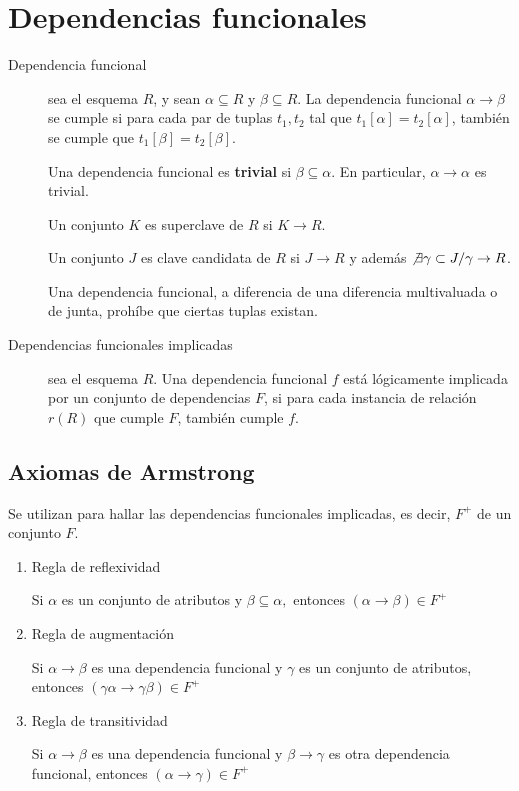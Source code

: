 \documentclass[a4paper, twoside]{article}
\begin{document}
\section{Dependencias funcionales}
\begin{description}
	\item[Dependencia funcional] sea el esquema $R$, y sean $\alpha \subseteq R$ y $\beta\subseteq R$. La dependencia funcional $\alpha \to \beta$ se cumple si para cada par de tuplas $t_{1}, t_{2}$ tal que $t_{1}[\alpha] = t_{2}[\alpha]$, también se cumple que $t_{1}[\beta]=t_{2}[\beta]$. 

	Una dependencia funcional es \textbf{trivial} si $\beta\subseteq\alpha$. En particular, $\alpha\to\alpha$ es trivial.

	Un conjunto $K$ es superclave de $R$ si $K\to R$.

	Un conjunto $J$ es clave candidata de $R$ si $J\to R$ y además $\not\exists\gamma\subset J/\gamma\to R$.

	Una dependencia funcional, a diferencia de una diferencia multivaluada o de junta, prohíbe que ciertas tuplas existan.

	\item[Dependencias funcionales implicadas] sea el esquema $R$. Una dependencia funcional $f$ está lógicamente implicada por un conjunto de dependencias $F$, si para cada instancia de relación $r(R)$ que cumple $F$, también cumple $f$.
\end{description}

\subsection{Axiomas de Armstrong}
Se utilizan para hallar las dependencias funcionales implicadas, es
decir, $F^{+}$ de un conjunto $F$.
\begin{enumerate}
	\item Regla de reflexividad
	
	Si $\alpha$ es un conjunto de atributos y $\beta\subseteq\alpha,$ entonces $(\alpha\to\beta)\in F^{+}$

	\item Regla de augmentación

	Si $\alpha\to\beta$ es una dependencia funcional y $\gamma$ es un conjunto de atributos, entonces $(\gamma\alpha\to\gamma\beta)\in F^{+}$

	\item Regla de transitividad

	Si $\alpha\to\beta$ es una dependencia funcional y $\beta\to\gamma$ es otra dependencia funcional, entonces $(\alpha\to\gamma)\in F^{+}$
\end{enumerate}
\end{document}
